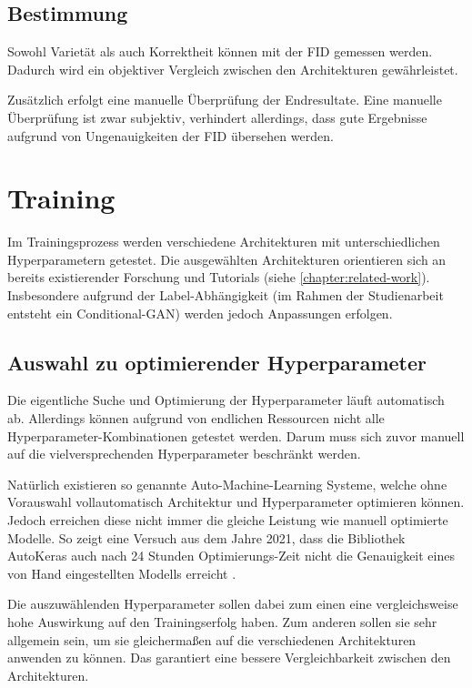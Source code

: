 \subsection{Bestimmung}
Sowohl Varietät als auch Korrektheit können mit der \acrlong{FID} \cite{frechet-inception-distance} gemessen werden.
Dadurch wird ein objektiver Vergleich zwischen den Architekturen gewährleistet.
\newline

Zusätzlich erfolgt eine manuelle Überprüfung der Endresultate.
Eine manuelle Überprüfung ist zwar subjektiv, verhindert allerdings, dass gute Ergebnisse aufgrund von Ungenauigkeiten der \acrshort{FID} übersehen werden.

\section{Training}
Im Trainingsprozess werden verschiedene Architekturen mit unterschiedlichen Hyperparametern getestet.
Die ausgewählten Architekturen orientieren sich an bereits existierender Forschung und Tutorials (siehe \cref{chapter:related-work}).
Insbesondere aufgrund der Label-Abhängigkeit (im Rahmen der Studienarbeit entsteht ein Conditional-GAN) werden jedoch Anpassungen erfolgen.


\subsection{Auswahl zu optimierender Hyperparameter}
Die eigentliche Suche und Optimierung der Hyperparameter läuft automatisch ab.
Allerdings können aufgrund von endlichen Ressourcen nicht alle Hyperparameter-Kombinationen getestet werden.
Darum muss sich zuvor manuell auf die vielversprechenden Hyperparameter beschränkt werden.
\newline

Natürlich existieren so genannte Auto-Machine-Learning Systeme, welche ohne Vorauswahl vollautomatisch Architektur und Hyperparameter optimieren können. 
Jedoch erreichen diese nicht immer die gleiche Leistung wie manuell optimierte Modelle.
So zeigt eine Versuch aus dem Jahre 2021, dass die Bibliothek AutoKeras \cite{auto-keras} auch nach 24 Stunden Optimierungs-Zeit nicht die Genauigkeit eines von Hand eingestellten Modells erreicht \cite[S. 2036]{dl-framework-evaluation}.
\newline

Die auszuwählenden Hyperparameter sollen dabei zum einen eine vergleichsweise hohe Auswirkung auf den Trainingserfolg haben.
Zum anderen sollen sie sehr allgemein sein, um sie gleichermaßen auf die verschiedenen Architekturen anwenden zu können.
Das garantiert eine bessere Vergleichbarkeit zwischen den Architekturen.
\newline

